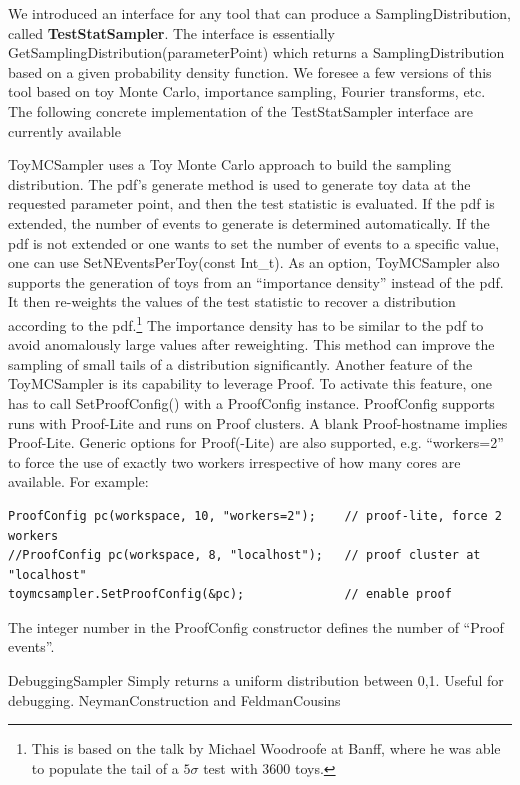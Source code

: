 \documentclass[11pt]{article}
\begin{document}
We introduced an interface for any tool that can produce a SamplingDistribution, called \textbf{TestStatSampler}.  The interface is essentially GetSamplingDistribution(parameterPoint) which returns a SamplingDistribution based on a given probability density function.  We foresee a few versions of this tool based on toy Monte Carlo, importance sampling, Fourier transforms, etc.  The following concrete implementation of the TestStatSampler interface are currently available

ToyMCSampler uses a Toy Monte Carlo approach to build the sampling distribution. The pdf's generate method is used to generate toy data at the requested parameter point, and then the test statistic is evaluated. If the pdf is extended, the number of events to generate is determined automatically. If the pdf is not extended or one wants to set the number of events to a specific value, one can use SetNEventsPerToy(const Int\_t).
As an option, ToyMCSampler also supports the generation of toys from an ``importance density'' instead of the pdf. It then re-weights the values of the test statistic to recover a distribution according to the pdf.\footnote{This is based on the talk by Michael Woodroofe at Banff, where he was able to populate the tail of a $5\sigma$ test with 3600 toys.} The importance density has to be similar to the pdf to avoid anomalously large values after reweighting.  This method can improve the sampling of small tails of a distribution significantly.
Another feature of the ToyMCSampler is its capability to leverage Proof. To activate this feature, one has to call SetProofConfig() with a ProofConfig instance. ProofConfig supports runs with Proof-Lite and runs on Proof clusters. A blank Proof-hostname implies Proof-Lite. Generic options for Proof(-Lite) are also supported, e.g. ``workers=2'' to force the use of exactly two workers irrespective of how many cores are available.  For example:
\begin{lstlisting}
ProofConfig pc(workspace, 10, "workers=2");    // proof-lite, force 2 workers
//ProofConfig pc(workspace, 8, "localhost");   // proof cluster at "localhost"
toymcsampler.SetProofConfig(&pc);              // enable proof
\end{lstlisting}
The integer number in the ProofConfig constructor defines the number of ``Proof events''.


DebuggingSampler Simply returns a uniform distribution between 0,1.  Useful for debugging.
NeymanConstruction and FeldmanCousins
\end{document}
